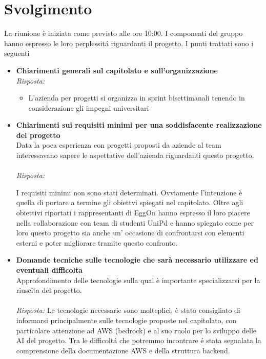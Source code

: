 \documentclass[a4paper,12pt]{article}
\begin{document}
\section{Svolgimento}
    La riunione è iniziata come previsto alle ore 10:00. I componenti del gruppo hanno espresso le loro perplessitá riguardanti il progetto. I punti trattati sono i seguenti
    \begin{itemize}
    \item \textbf{Chiarimenti generali sul capitolato e sull'organizzazione}\\
    \noindent
    \textit{Risposta:} \\
    \begin{itemize}
        \item L'azienda per progetti si organizza in sprint bisettimanali tenendo in considerazione gli impegni universitari
    \end{itemize}
    
    \vspace{1em}

    \item \textbf{Chiarimenti sui requisiti minimi per una soddisfacente realizzazione del progetto}\\
    \noindent
    Data la poca esperienza con progetti proposti da aziende al team interessavano sapere le aspettative dell'azienda riguardanti questo progetto. 
    \\ \\
    \textit{Risposta:} 
    
    I requisiti minimi non sono stati determinati. Ovviamente l'intenzione è quella di portare a termine gli obiettvi spiegati nel capitolato. Oltre agli obiettivi riportati i rappresentanti di EggOn hanno espresso il loro piacere nella collaborazione con team di studenti UniPd e hanno spiegato come per loro questo progetto sia anche un' occasione di confrontarsi con elementi esterni e poter migliorare tramite questo confronto.
    
    \vspace{1em}

    \item \textbf{Domande tecniche sulle tecnologie che sarà necessario utilizzare ed eventuali difficolta}\\
    \noindent
    Approfondimento delle tecnologie sulla qual è importante specializzarsi per la riuscita del progetto.\\ \\
    \textit{Risposta:} 
    Le tecnologie necessarie sono molteplici, è stato consigliato di informarsi principalmente sulle tecnologie proposte nel capitolato, con particolare attenzione ad AWS (bedrock) e al suo ruolo per lo sviluppo delle AI del progetto. Tra le difficoltá che potremmo incontrare é stata segnalata la comprensione della documentazione AWS e della struttura backend.
    \vspace{1em}


\end{itemize}
\end{document}
